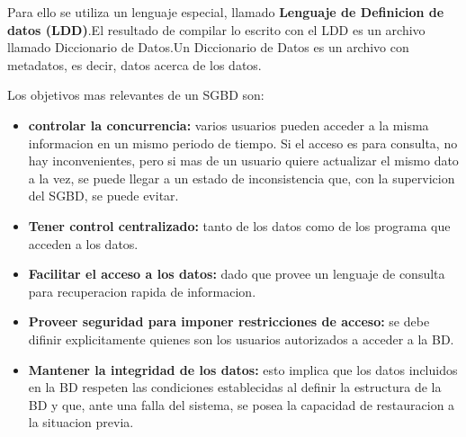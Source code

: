 Para ello se utiliza un lenguaje especial, llamado \textbf{Lenguaje de Definicion de datos (LDD)}.El resultado de compilar lo escrito con el LDD es un archivo llamado Diccionario de Datos.Un Diccionario de Datos es un archivo con metadatos, es decir, datos acerca de los datos.

Los objetivos mas relevantes de un SGBD son:
\begin{itemize}
  \item \textbf{controlar la concurrencia: }varios usuarios pueden acceder a la misma informacion en un mismo periodo de tiempo. Si el acceso es para consulta, no hay inconvenientes, pero si mas de un usuario quiere actualizar el mismo dato a la vez, se puede llegar a un estado de inconsistencia que, con la supervicion del SGBD, se puede evitar.
  \item \textbf{Tener control centralizado: }tanto de los datos como de los programa que acceden a los datos.
  \item \textbf{Facilitar el acceso a los datos: }dado que provee un lenguaje de consulta para recuperacion rapida de informacion.
  \item \textbf{Proveer seguridad para imponer restricciones de acceso: }se debe difinir explicitamente quienes son los usuarios autorizados a acceder a la BD.
  \item \textbf{Mantener la integridad de los datos: }esto implica que los datos incluidos en la BD respeten las condiciones establecidas al definir la estructura de la BD y que, ante una falla del sistema, se posea la capacidad de restauracion a la situacion previa.
\end{itemize}
